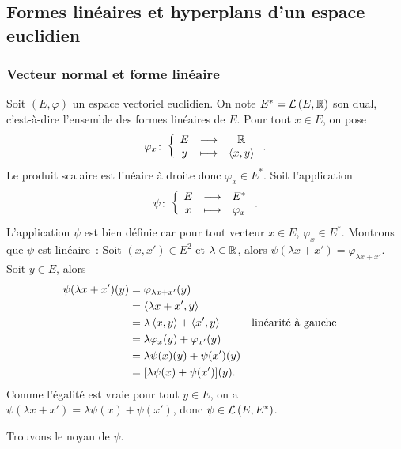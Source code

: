 \subsection{Formes linéaires et hyperplans d'un espace euclidien}

\subsubsection{Vecteur normal et forme linéaire}

Soit \((E,\varphi)\) un espace vectoriel euclidien. On note \(E^*=\mathcal{L}\left(E,\mathbb{R}\right)\) son dual, c'est-à-dire l'ensemble des formes linéaires de \(E\). Pour tout \(x \in E\), on pose
\begin{equation}
  \varphi_x\colon \left\{\begin{array}{ccc} E & \longrightarrow &\mathbb{R}\\ y & \longmapsto & \left\langle{x},{y}\right\rangle \end{array} \right..
\end{equation}
Le produit scalaire est linéaire à droite donc \(\varphi_x \in E^*\). Soit l'application
\begin{equation}
  \psi\colon \left\{\begin{array}{ccc} E & \longrightarrow &E^*\\ x & \longmapsto & \varphi_x \end{array} \right..
\end{equation}
L'application \(\psi\) est bien définie car pour tout vecteur \(x \in E\), \(\varphi_x \in E^*\). Montrons que \(\psi\) est linéaire~: Soit \((x,x') \in E^2\) et \(\lambda \in \mathbb{R}\), alors \(\psi(\lambda x+x') = \varphi_{\lambda x+x'}\). Soit \(y \in E\), alors
\begin{align}
  \psi(\lambda x+x')(y) &= \varphi_{\lambda x+x'}(y) \\
  &=\left\langle{\lambda x+x'},{y}\right\rangle \\
  &=\lambda \left\langle{x},{y}\right\rangle + \left\langle{x'},{y}\right\rangle && \text{linéarité à gauche}\\
  &=\lambda \varphi_x(y)+ \varphi_{x'}(y) \\
  &=\lambda \psi(x)(y)+\psi(x')(y)\\
  &=[\lambda \psi(x)+\psi(x')](y).
\end{align}
Comme l'égalité est vraie pour tout \(y \in E\), on a \(\psi(\lambda x+x')=\lambda \psi(x)+\psi(x')\), donc \(\psi \in \mathcal{L}\left(E,E^*\right)\).

Trouvons le noyau de \(\psi\).

